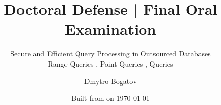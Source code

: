 \title{Doctoral Defense | Final Oral Examination}

\subtitle{
	Secure and Efficient Query Processing in Outsourced Databases \\
	{\small Range Queries \cite{ore-benchmark-17, epsolute}, Point Queries \cite{epsolute}, \knn{} Queries \cite{k-anon}}
}

\date{Built from \href{https://git.dbogatov.org/bu/defense/presentation/commit/\version}{\emph{\version}} on \today}

\author{Dmytro Bogatov \\ }


\def\wm{\texttt{[image: coat-of-arms-1]}}

